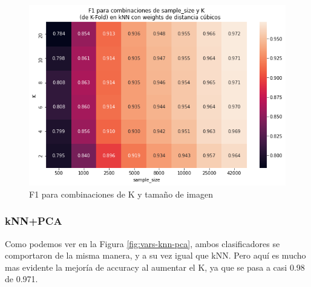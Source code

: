\documentclass[a4paper]{article}
\begin{document}
    \begin{figure}[H]
        \centering
        \includegraphics[scale=0.65]{img/exp/knn/knn_variaciones_f1.png}
        \caption{F1 para combinaciones de K y tamaño de imagen}
        \label{fig:knn-variaciones-f1}
    \end{figure}

   
    \subsubsection{kNN+PCA}
    Como podemos ver en la Figura \ref{fig:vars-knn-pca}, ambos clasificadores se comportaron de la misma manera, y a su vez igual que kNN. Pero aquí es mucho mas evidente la mejoría de accuracy al aumentar el K, ya que se pasa a casi 0.98 de 0.971.
\end{document}
